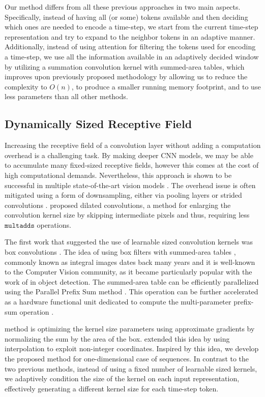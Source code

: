 \documentclass{article}
\begin{document}
Our method differs from all these previous approaches in two main aspects. Specifically, instead of having all (or some) tokens available and then deciding which ones are needed to encode a time-step, we start from the current time-step representation and try to expand to the neighbor tokens in an adaptive manner.  Additionally, instead of using attention for filtering the tokens used for encoding a time-step, we use all the information available in an adaptively decided window by utilizing a summation convolution kernel with summed-area tables, which improves upon previously proposed methodology by allowing us to reduce the complexity to $O(n)$, to produce a smaller running memory footprint, and to use less parameters than all other methods.

\subsection{Dynamically Sized Receptive Field}
Increasing the receptive field of a convolution layer without adding a computation overhead is a challenging task. By making deeper CNN models, we may be able to accumulate many fixed-sized receptive fields, however this comes at the cost of high computational demands. Nevertheless, this approach is shown to be successful in multiple state-of-the-art vision models \cite{DBLP:journals/corr/HeZRS15,DBLP:journals/corr/SzegedyIV16}. The overhead issue is often mitigated using a form of downsampling, either via pooling layers \cite{726791} or strided convolutions \cite{springenberg2014striving}. \citet{yu2015multiscale} proposed dilated convolutions, a method for enlarging the convolution kernel size by skipping intermediate pixels and thus, requiring less $\texttt{multadds}$ operations.

The first work that suggested the use of learnable sized convolution kernels was box convolutions \cite{NIPS2018_7859}. The idea of using box filters with summed-area tables \cite{crow1984summed}, commonly known as integral images dates back many years and it is well-known to the Computer Vision community, as it became particularly popular with the work of \citet{Viola01robustreal-time} in object detection. The summed-area table can be efficiently parallelized using the Parallel Prefix Sum method \cite{10.1145/322217.322232}. This operation can be further accelerated as a hardware functional unit dedicated to compute the multi-parameter prefix-sum operation \cite{18021}. 

\citet{NIPS2018_7859} method is optimizing the kernel size parameters using approximate gradients by normalizing the sum by the area of the box. \citet{zhang2019accelerating} extended this idea by using interpolation to exploit non-integer coordinates. 
Inspired by this idea, we develop the proposed method for one-dimensional case of sequences. 
In contrast to the two previous methods, instead of using a fixed number of learnable sized kernels, we adaptively condition the size of the kernel on each input representation, effectively generating a different kernel size for each time-step token.
\end{document}
